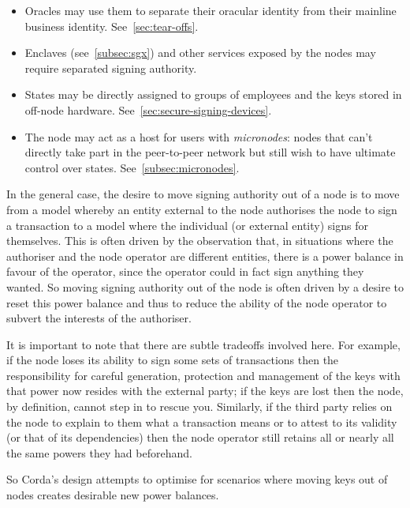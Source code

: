 \documentclass{article}
\begin{document}
\begin{itemize}
    \item Oracles may use them to separate their oracular identity from their mainline business identity.
          See~\cref{sec:tear-offs}.
    \item Enclaves (see~\cref{subsec:sgx}) and other services exposed by the nodes may require separated
          signing authority.
    \item States may be directly assigned to groups of employees and the keys stored in off-node hardware.
          See~\cref{sec:secure-signing-devices}.
    \item The node may act as a host for users with \emph{micronodes}: nodes that can't directly take part
          in the peer-to-peer network but still wish to have ultimate control over states. See~\cref{subsec:micronodes}.
\end{itemize}

In the general case, the desire to move signing authority out of a node is to move from a model whereby an entity
external to the node authorises the node to sign a transaction to a model where the individual (or external entity)
signs for themselves. This is often driven by the observation that, in situations where the authoriser and the node
operator are different entities, there is a power balance in favour of the operator, since the operator could in
fact sign anything they wanted. So moving signing authority out of the node is often driven by a desire to reset
this power balance and thus to reduce the ability of the node operator to subvert the interests of the authoriser.

It is important to note that there are subtle tradeoffs involved here. For example, if the node loses its ability
to sign some sets of transactions then the responsibility for careful generation, protection and management of the
keys with that power now resides with the external party; if the keys are lost then the node, by definition, cannot
step in to rescue you. Similarly, if the third party relies on the node to explain to them what a transaction means
or to attest to its validity (or that of its dependencies) then the node operator still retains all or nearly all
the same powers they had beforehand.

So Corda's design attempts to optimise for scenarios where moving keys out of nodes creates desirable new power
balances.

\end{document}

